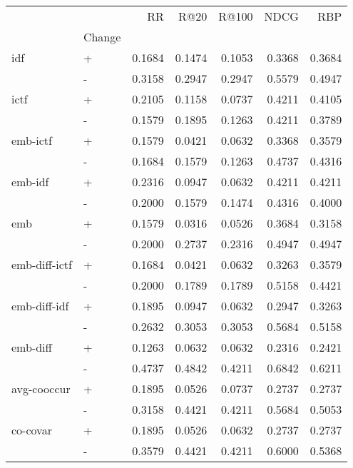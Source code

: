 \begin{tabular}{llrrrrr}
\toprule
         &   &      RR &    R@20 &   R@100 &    NDCG &     RBP \\
{} & Change &         &         &         &         &         \\
\midrule
idf & + &  0.1684 &  0.1474 &  0.1053 &  0.3368 &  0.3684 \\
         & - &  0.3158 &  0.2947 &  0.2947 &  0.5579 &  0.4947 \\
ictf & + &  0.2105 &  0.1158 &  0.0737 &  0.4211 &  0.4105 \\
         & - &  0.1579 &  0.1895 &  0.1263 &  0.4211 &  0.3789 \\
emb-ictf & + &  0.1579 &  0.0421 &  0.0632 &  0.3368 &  0.3579 \\
         & - &  0.1684 &  0.1579 &  0.1263 &  0.4737 &  0.4316 \\
emb-idf & + &  0.2316 &  0.0947 &  0.0632 &  0.4211 &  0.4211 \\
         & - &  0.2000 &  0.1579 &  0.1474 &  0.4316 &  0.4000 \\
emb & + &  0.1579 &  0.0316 &  0.0526 &  0.3684 &  0.3158 \\
         & - &  0.2000 &  0.2737 &  0.2316 &  0.4947 &  0.4947 \\
emb-diff-ictf & + &  0.1684 &  0.0421 &  0.0632 &  0.3263 &  0.3579 \\
         & - &  0.2000 &  0.1789 &  0.1789 &  0.5158 &  0.4421 \\
emb-diff-idf & + &  0.1895 &  0.0947 &  0.0632 &  0.2947 &  0.3263 \\
         & - &  0.2632 &  0.3053 &  0.3053 &  0.5684 &  0.5158 \\
emb-diff & + &  0.1263 &  0.0632 &  0.0632 &  0.2316 &  0.2421 \\
         & - &  0.4737 &  0.4842 &  0.4211 &  0.6842 &  0.6211 \\
avg-cooccur & + &  0.1895 &  0.0526 &  0.0737 &  0.2737 &  0.2737 \\
         & - &  0.3158 &  0.4421 &  0.4211 &  0.5684 &  0.5053 \\
co-covar & + &  0.1895 &  0.0526 &  0.0632 &  0.2737 &  0.2737 \\
         & - &  0.3579 &  0.4421 &  0.4211 &  0.6000 &  0.5368 \\
\bottomrule
\end{tabular}
